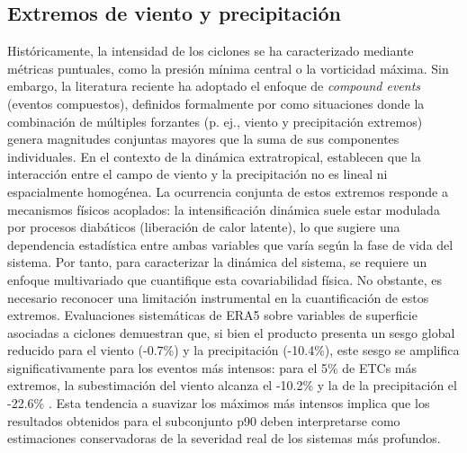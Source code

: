 \subsection{Extremos de viento y precipitación}\label{subsec:tb_compound_def}
Históricamente, la intensidad de los ciclones se ha caracterizado mediante métricas puntuales, como la presión mínima central o la vorticidad máxima. Sin embargo, la literatura reciente ha adoptado el enfoque de \textit{compound events} (eventos compuestos), definidos formalmente por \citet{zscheischler2018future} como situaciones donde la combinación de múltiples forzantes (p. ej., viento y precipitación extremos) genera magnitudes conjuntas mayores que la suma de sus componentes individuales. En el contexto de la dinámica extratropical, \citet{chen2025characteristics} establecen que la interacción entre el campo de viento y la precipitación no es lineal ni espacialmente homogénea. La ocurrencia conjunta de estos extremos responde a mecanismos físicos acoplados: la intensificación dinámica suele estar modulada por procesos diabáticos (liberación de calor latente), lo que sugiere una dependencia estadística entre ambas variables que varía según la fase de vida del sistema. Por tanto, para caracterizar la dinámica del sistema, se requiere un enfoque multivariado que cuantifique esta covariabilidad física.
No obstante, es necesario reconocer una limitación instrumental en la cuantificación de estos extremos. Evaluaciones sistemáticas de ERA5 sobre variables de superficie asociadas a ciclones demuestran que, si bien el producto presenta un sesgo global reducido para el viento (-0.7\%) y la precipitación (-10.4\%), este sesgo se amplifica significativamente para los eventos más intensos: para el 5\% de ETCs más extremos, la subestimación del viento alcanza el -10.2\% y la de la precipitación el -22.6\% \citep{chen2024evaluation}. Esta tendencia a suavizar los máximos más intensos implica que los resultados obtenidos para el subconjunto p90 deben interpretarse como estimaciones conservadoras de la severidad real de los sistemas más profundos.

